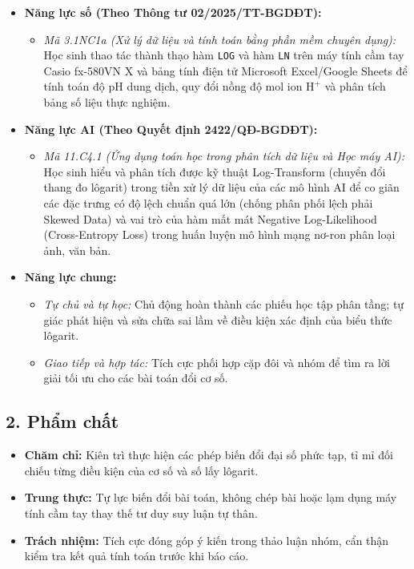 \documentclass[12pt, a4paper]{article}
\begin{document}
\begin{itemize}[leftmargin=1.2cm]
    \item \textbf{Năng lực số (Theo Thông tư 02/2025/TT-BGDĐT):}
    \begin{itemize}[leftmargin=0.6cm]
        \item \textit{Mã 3.1NC1a (Xử lý dữ liệu và tính toán bằng phần mềm chuyên dụng):} Học sinh thao tác thành thạo hàm \texttt{LOG} và hàm \texttt{LN} trên máy tính cầm tay Casio fx-580VN X và bảng tính điện tử Microsoft Excel/Google Sheets để tính toán độ pH dung dịch, quy đổi nồng độ mol ion $\text{H}^+$ và phân tích bảng số liệu thực nghiệm.
    \end{itemize}

    \item \textbf{Năng lực AI (Theo Quyết định 2422/QĐ-BGDĐT):}
    \begin{itemize}[leftmargin=0.6cm]
        \item \textit{Mã 11.C4.1 (Ứng dụng toán học trong phân tích dữ liệu và Học máy AI):} Học sinh hiểu và phân tích được kỹ thuật Log-Transform (chuyển đổi thang đo lôgarit) trong tiền xử lý dữ liệu của các mô hình AI để co giãn các đặc trưng có độ lệch chuẩn quá lớn (chống phân phối lệch phải Skewed Data) và vai trò của hàm mất mát Negative Log-Likelihood (Cross-Entropy Loss) trong huấn luyện mô hình mạng nơ-ron phân loại ảnh, văn bản.
    \end{itemize}

    \item \textbf{Năng lực chung:}
    \begin{itemize}[leftmargin=0.6cm]
        \item \textit{Tự chủ và tự học:} Chủ động hoàn thành các phiếu học tập phân tầng; tự giác phát hiện và sửa chữa sai lầm về điều kiện xác định của biểu thức lôgarit.
        \item \textit{Giao tiếp và hợp tác:} Tích cực phối hợp cặp đôi và nhóm để tìm ra lời giải tối ưu cho các bài toán đổi cơ số.
    \end{itemize}
\end{itemize}

\subsection*{2. Phẩm chất}

\begin{itemize}[leftmargin=1.2cm]
    \item \textbf{Chăm chỉ:} Kiên trì thực hiện các phép biến đổi đại số phức tạp, tỉ mỉ đối chiếu từng điều kiện của cơ số và số lấy lôgarit.
    \item \textbf{Trung thực:} Tự lực biến đổi bài toán, không chép bài hoặc lạm dụng máy tính cầm tay thay thế tư duy suy luận tự thân.
    \item \textbf{Trách nhiệm:} Tích cực đóng góp ý kiến trong thảo luận nhóm, cẩn thận kiểm tra kết quả tính toán trước khi báo cáo.
\end{itemize}
\end{document}
